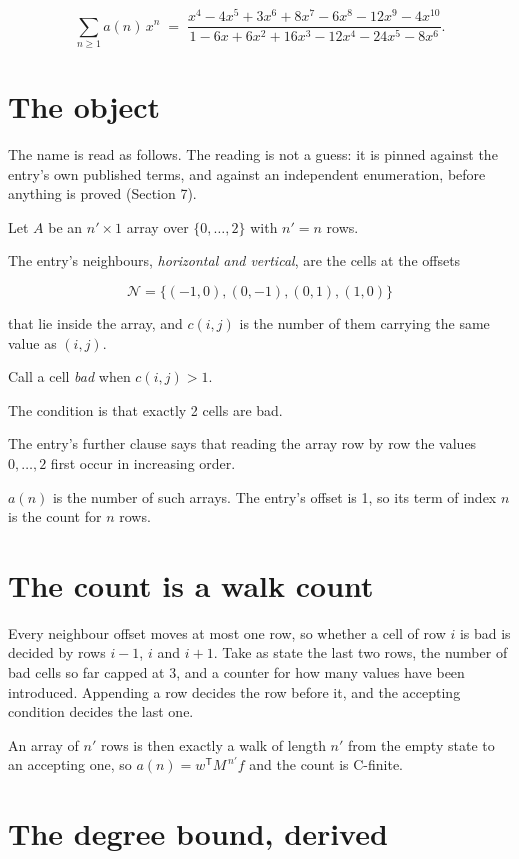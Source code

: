 \documentclass[11pt]{article}
\theoremstyle{definition}
\begin{document}
\[\sum_{n \ge 1} a(n)\,x^n \;=\; \frac{x^{4} - 4x^{5} + 3x^{6} + 8x^{7} - 6x^{8} - 12x^{9} - 4x^{10}}{1 - 6x + 6x^{2} + 16x^{3} - 12x^{4} - 24x^{5} - 8x^{6}}.\]

\section{The object}

The name is read as follows. The reading is not a guess: it is pinned against the entry's own published terms, and against an independent enumeration, before anything is proved (Section 7).

Let $A$ be an $n' \times 1$ array over $\{0,\dots,2\}$ with $n' = n$ rows.

The entry's neighbours, {\itshape horizontal and vertical}, are the cells at the offsets

\[\mathcal{N} = \{(-1,0), (0,-1), (0,1), (1,0)\}\]

that lie inside the array, and $c(i,j)$ is the number of them carrying the same value as $(i,j)$.

Call a cell {\itshape bad} when $c(i,j) > 1$.

The condition is that exactly 2 cells are bad.

The entry's further clause says that reading the array row by row the values $0,\dots,2$ first occur in increasing order.

$a(n)$ is the number of such arrays. The entry's offset is 1, so its term of index $n$ is the count for $n$ rows.

\section{The count is a walk count}

Every neighbour offset moves at most one row, so whether a cell of row $i$ is bad is decided by rows $i-1$, $i$ and $i+1$. Take as state the last two rows, the number of bad cells so far capped at 3, and a counter for how many values have been introduced. Appending a row decides the row before it, and the accepting condition decides the last one.

An array of $n'$ rows is then exactly a walk of length $n'$ from the empty state to an accepting one, so $a(n) = w^{\mathsf T}M^{\,n'}f$ and the count is C-finite.

\section{The degree bound, derived}
\end{document}
